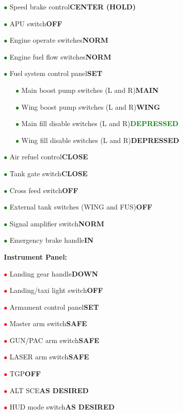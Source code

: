 \documentclass[a4paper,12pt,dvipsnames]{letter}
\newcommand{\button}[1]{\textbf{#1}}
\newcommand{\ok}[1]{\textcolor{Green}{\textbf{#1}}}
\newcommand{\ri}{\textcolor{Red}{$\bullet$\;}}
\newcommand{\gi}{\textcolor{Green}{$\bullet$\;}}
\newcommand{\tb}[1]{\textbf{#1}}
\begin{document}
{\begin{itemize}
 \item[\gi] Speed brake control\dotfill\button{CENTER (HOLD)}
 \item[\gi] APU switch\dotfill\button{OFF}
 \item[\gi] Engine operate switches\dotfill\button{NORM}
 \item[\gi] Engine fuel flow switches\dotfill\button{NORM}
 \item[\gi] Fuel system control panel\dotfill\button{SET}
 \begin{itemize}
  \item[\gi] Main boost pump switches (L and R)\dotfill\button{MAIN}
  \item[\gi] Wing boost pump switches (L and R)\dotfill\button{WING}
  \item[\gi] Main fill disable switches (L and R)\dotfill\ok{DEPRESSED}
  \item[\gi] Wing fill disable switches (L and R)\dotfill\button{DEPRESSED}
 \end{itemize}
 \item[\gi] Air refuel control\dotfill\button{CLOSE}
 \item[\gi] Tank gate switch\dotfill\button{CLOSE}
 \item[\gi] Cross feed switch\dotfill\button{OFF}
 \item[\gi] External tank switches (WING and FUS)\dotfill\button{OFF}
 \item[\gi] Signal amplifier switch\dotfill\button{NORM}
 \item[\gi] Emergency brake handle\dotfill\button{IN}
\end{itemize}
\newpage
\begin{itemize}
 \item[]\tb{Instrument Panel:}
 \item[\ri] Landing gear handle\dotfill\button{DOWN}
 \item[\ri] Landing/taxi light switch\dotfill\button{OFF}
 \item[\ri] Armament control panel\dotfill\button{SET}
 \item[\ri] Master arm switch\dotfill\button{SAFE}
 \item[\ri] GUN/PAC arm switch\dotfill\button{SAFE}
 \item[\ri] LASER arm switch\dotfill\button{SAFE}
 \item[\ri] TGP\dotfill\button{OFF}
 \item[\ri] ALT SCE\dotfill\button{AS DESIRED}
 \item[\ri] HUD mode switch\dotfill\button{AS DESIRED}

\end{itemize}}
\end{document}
